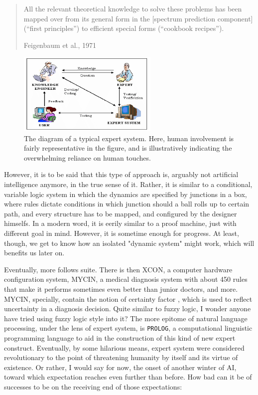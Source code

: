 \blockquote[Feigenbaum et al., 1971]{All the relevant theoretical knowledge to solve these problems has been mapped over from its general form in the [spectrum prediction component] (“first principles”) to efficient special forms (“cookbook recipes”).}

\begin{figure}
    \centering
    \includegraphics[width=0.6\textwidth]{img/expertsystem1.png}
    \caption{The diagram of a typical expert system. Here, human involvement is fairly representative in the figure, and is illustratively indicating the overwhelming reliance on human touches.}
\end{figure}

However, it is to be said that this type of approach is, arguably not artificial intelligence anymore, in the true sense of it. Rather, it is similar to a conditional, variable logic system in which the dynamics are specified by junctions in a box, where rules dictate conditions in which junction should a ball rolls up to certain path, and every structure has to be mapped, and configured by the designer himselfs. In a modern word, it is eerily similar to a proof machine, just with different goal in mind. However, it is sometime enough for progress. At least, though, we get to know how an isolated "dynamic system" might work, which will benefits us later on. 

Eventually, more follows suite. There is then XCON, a computer hardware configuration system, MYCIN, a medical diagnosis system with about 450 rules that make it performs sometimes even better than junior doctors, and more. MYCIN, specially, contain the notion of certainty factor , which is used to reflect uncertainty in a diagnosis decision. Quite similar to fuzzy logic, I wonder anyone have tried using fuzzy logic style into it? The more epitome of natural language processing, under the lens of expert system, is \texttt{PROLOG}, a computational linguistic programming language to aid in the construction of this kind of new expert construct. Eventually, by some hilarious means, expert system were considered revolutionary to the point of threatening humanity by itself and its virtue of existence. Or rather, I would say for now, the onset of another winter of AI, toward which expectation reaches even further than before. How bad can it be of successes to be on the receiving end of those expectations: 


